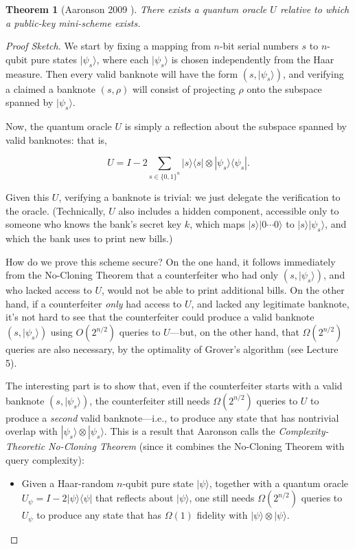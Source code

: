 \documentclass[12pt]{report}
\theoremstyle{plain}
\newtheorem{theorem}{Theorem}[section]
\theoremstyle{definition}
\renewcommand{\bra}[1]{\langle#1|}
\renewcommand{\ket}[1]{|#1\rangle}
\begin{document}
\begin{theorem}[Aaronson 2009 \cite{Aar09}] There exists a quantum oracle $U$ relative to which a public-key mini-scheme exists.
\label{qomoney}
\end{theorem}
\begin{proof}[Proof Sketch] We start by fixing a mapping from $n$-bit serial numbers $s$ to $n$-qubit pure states $\ket{\psi_s}$, where each $\ket{\psi_s}$ is chosen independently from the Haar measure.  Then every valid banknote will have the form $(s,\ket{\psi_s})$, and verifying a claimed a banknote $(s,\rho)$ will consist of projecting $\rho$ onto the subspace spanned by $\ket{\psi_s}$.

Now, the quantum oracle $U$ is simply a reflection about the subspace spanned by valid banknotes: that is,

$$ U = I - 2\sum_{s \in \{0,1\}^n} \ket{s}\bra{s} \otimes \ket{\psi_s}\bra{\psi_s}. $$

Given this $U$, verifying a banknote is trivial: we just delegate the verification to the oracle.  (Technically, $U$ also includes a hidden component, accessible only to someone who knows the bank's secret key $k$, which maps $\ket{s}\ket{0\cdots 0}$ to $\ket{s}\ket{\psi_s}$, and which the bank uses to print new bills.)

How do we prove this scheme secure?  On the one hand, it follows immediately from the No-Cloning Theorem that a counterfeiter who had only $(s,\ket{\psi_s})$, and who lacked access to $U$, would not be able to print additional bills.  On the other hand, if a counterfeiter {\em only} had access to $U$, and lacked any legitimate banknote, it's not hard to see that the counterfeiter could produce a valid banknote $(s,\ket{\psi_s})$ using $O(2^{n/2})$ queries to $U$---but, on the other hand, that $\Omega(2^{n/2})$ queries are also necessary, by the optimality of Grover's algorithm (see Lecture 5).

The interesting part is to show that, even if the counterfeiter starts with a valid banknote $(s,\ket{\psi_s})$, the counterfeiter still needs $\Omega(2^{n/2})$ queries to $U$ to produce a {\em second} valid banknote---i.e., to produce any state that has nontrivial overlap with $\ket{\psi_s}\otimes \ket{\psi_s}$.  This is a result that Aaronson \cite{Aar09} calls the {\em Complexity-Theoretic No-Cloning Theorem} (since it combines the No-Cloning Theorem with query complexity):

\begin{itemize}
\item Given a Haar-random $n$-qubit pure state $\ket{\psi}$, together with a quantum oracle $U_{\psi}=I-2\ket{\psi}\bra{\psi}$ that reflects about $\ket{\psi}$, one still needs $\Omega(2^{n/2})$ queries to $U_{\psi}$ to produce any state that has $\Omega(1)$ fidelity with $\ket{\psi}\otimes \ket{\psi}$.
\end{itemize}


\end{proof}
\end{document}
